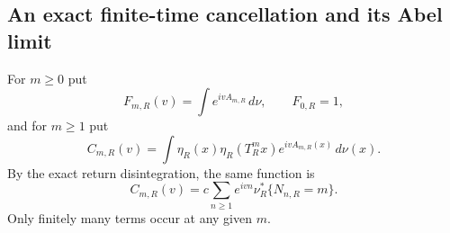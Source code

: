\subsection{An exact finite-time cancellation and its Abel limit}
For $m\ge0$ put
\[
 F_{m,R}(v)=\int e^{ivA_{m,R}}\,d\nu,\qquad F_{0,R}=1,
\]
and for $m\ge1$ put
\begin{equation}\label{eq:v39-section-characteristic}
 C_{m,R}(v)=\int\eta_R(x)\eta_R(T_R^mx)e^{ivA_{m,R}(x)}\,d\nu(x).
\end{equation}
By the exact return disintegration, the same function is
\begin{equation}\label{eq:v39-return-generating-coefficient}
 C_{m,R}(v)=c\sum_{n\ge1}e^{ivn}\nu_R^*\{N_{n,R}=m\}.
\end{equation}
Only finitely many terms occur at any given $m$.

